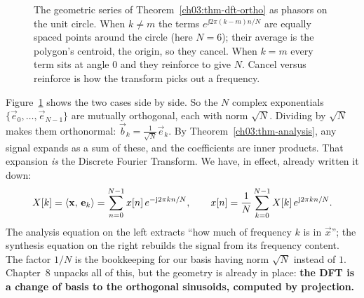 \begin{figure}[H]
\centering
{}
\caption{The geometric series of Theorem~\ref{ch03:thm-dft-ortho} as phasors on the unit circle.
When $k\neq m$ the terms $e^{\jj 2\pi(k-m)n/N}$ are equally spaced points around the circle (here
$N=6$); their average is the polygon's centroid, the origin, so they cancel. When $k=m$ every term
sits at angle $0$ and they reinforce to give $N$. Cancel versus reinforce is how the transform picks
out a frequency.}
\label{ch03:fig-phasor-sum}
\end{figure}

Figure~\ref{ch03:fig-phasor-sum} shows the two cases side by side.
So the $N$ complex exponentials $\{\vec{e}_0,\dots,\vec{e}_{N-1}\}$ are mutually orthogonal, each
with norm $\sqrt{N}$. Dividing by $\sqrt N$ makes them orthonormal:
$\vec{b}_k = \tfrac{1}{\sqrt N}\vec{e}_k$. By
Theorem~\ref{ch03:thm-analysis}, any signal expands as a sum of these, and the coefficients are inner
products. That expansion \emph{is} the Discrete Fourier Transform. We have, in effect, already
written it down:
\[
  X[k] = \langle \mathbf{x},\, \mathbf{e}_k \rangle = \sum_{n=0}^{N-1} x[n]\, e^{-\mathrm{j} 2\pi k n/N},
  \qquad
  x[n] = \frac{1}{N}\sum_{k=0}^{N-1} X[k]\, e^{\mathrm{j} 2\pi k n/N}.
\]
The analysis equation on the left extracts ``how much of frequency $k$ is in $\vec{x}$''; the
synthesis equation on the right rebuilds the signal from its frequency content. The factor $1/N$ is
the bookkeeping for our basis having norm $\sqrt N$ instead of $1$. Chapter~8 unpacks all of this,
but the geometry is already in place: \textbf{the DFT is a change of basis to the orthogonal
sinusoids, computed by projection.}


